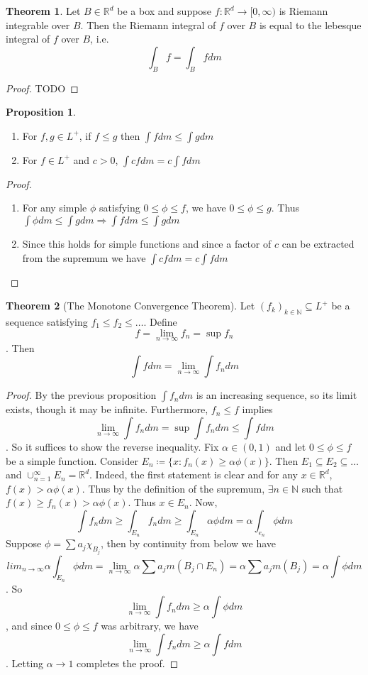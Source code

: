 \documentclass{article}
\theoremstyle{definition}
\newtheorem{prop}{Proposition}[section]
\newtheorem{theorem}{Theorem}[section]
\theoremstyle{remark}
\theoremstyle{remark}
\def\reals{{\mathbb R}}
\def\naturals{{\mathbb N}}
\begin{document}
\begin{theorem}
Let $B \in \reals^d$ be a box and suppose $f: \reals^d \to [0, \infty)$ is Riemann integrable over $B$. Then the Riemann integral of $f$ over $B$ is equal to the lebesque integral of $f$ over $B$, i.e.
$$\int_B f = \int_B f dm$$
\end{theorem}
\begin{proof}
TODO
\end{proof}
\begin{prop}
\begin{enumerate}
	\item For $f,g \in L^{+}$, if $f \leq g$ then $\int f dm \leq \int g dm$
	\item For $f \in L^{+}$ and $c > 0$, $\int cf dm = c \int f dm$
\end{enumerate}
\end{prop}
\begin{proof}
\begin{enumerate}
	\item For any simple $\phi$ satisfying $0 \leq \phi \leq f$, we have $0 \leq \phi \leq g$. Thus $\int \phi dm \leq \int g dm \Rightarrow \int f dm \leq \int g dm$
	\item Since this holds for simple functions and since a factor of $c$ can be extracted from the supremum we have $\int c f dm = c \int f dm$
\end{enumerate}
\end{proof}
\begin{theorem}[The Monotone Convergence Theorem]
Let $(f_k)_{k\in \naturals} \subseteq L^{+}$ be a sequence satisfying $f_1 \leq f_2 \leq \dots$. Define
$$f = \lim_{n\to\infty} f_n = \sup f_n$$. 
Then $$\int f dm = \lim_{n\to \infty} \int f_n dm$$
\end{theorem}
\begin{proof}
By the previous proposition $\int f_n dm$ is an increasing sequence, so its limit exists, though it may be infinite. Furthermore, $f_n \leq f$ implies
$$\lim_{n\to \infty} \int f_n dm = \sup \int f_n dm \leq \int f dm$$.
 So it suffices to show the reverse inequality. Fix $\alpha \in (0, 1)$ and let $0 \leq \phi \leq f$ be a simple function. Consider $E_n \coloneqq \{x : f_n(x) \geq \alpha \phi(x)\}$. Then $E_1 \subseteq E_2 \subseteq \dots$ and $\cup_{n=1}^\infty E_n = \reals^d$. Indeed, the first statement is clear and for any $x \in \reals^d$, $f(x) > \alpha \phi(x)$. Thus by the definition of the supremum, $\exists n\in\naturals$ such that $f(x) \geq f_n(x) > \alpha \phi(x)$. Thus $x \in E_n$. Now, 
$$\int f_n dm \geq \int_{E_n} f_n dm \geq \int_{E_n} \alpha \phi dm = \alpha \int_{e_n} \phi dm$$
Suppose $\phi = \sum a_j \chi_{B_j}$, then by continuity from below we have
$$lim_{n\to\infty} \alpha \int_{E_n} \phi dm = \lim_{n\to\infty} \alpha \sum a_j m(B_j \cap E_n) = \alpha \sum a_j m(B_j) = \alpha \int \phi dm$$. 
So
$$\lim_{n\to\infty} \int f_n dm \geq \alpha \int \phi dm$$,
and since $0 \leq \phi \leq f$ was arbitrary, we have
$$\lim_{n\to \infty} \int f_n dm \geq \alpha \int f dm$$. Letting $\alpha \to 1$ completes the proof.
\end{proof}
\end{document}
